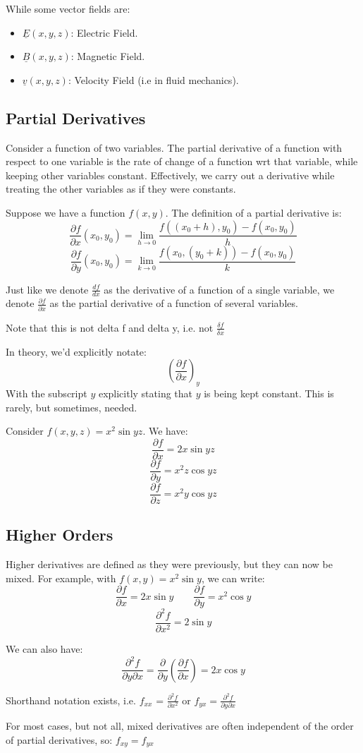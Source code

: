 While some vector fields are:
\begin{itemize}
    \item $\underline{E}(x, y, z)$: Electric Field.
    \item $\underline{B}(x, y, z)$: Magnetic Field.
    \item $\underline{v}(x, y, z)$: Velocity Field (i.e in fluid mechanics).
\end{itemize}

\subsection{Partial Derivatives}
Consider a function of two variables. The partial derivative of a function with respect to one variable is the rate of change of a function wrt that variable, while keeping other variables constant. Effectively, we carry out a derivative while treating the other variables as if they were constants.

Suppose we have a function $f(x, y)$. The definition of a partial derivative is:
\[
    \frac{\partial f}{\partial x}(x_0, y_0) = \lim_{h \to 0} \frac{f((x_0 + h), y_0) - f(x_0, y_0)}{h}
\]
\[
    \frac{\partial f}{\partial y}(x_0, y_0) = \lim_{k \to 0} \frac{f(x_0, (y_0 + k)) - f(x_0, y_0)}{k}
\]

Just like we denote $\frac{df}{dx}$ as the derivative of a function of a single variable, we denote $\frac{\partial f}{\partial x}$ as the partial derivative of a function of several variables.

Note that this is not delta f and delta y, i.e. not $\frac{\delta f}{\delta x}$

In theory, we'd explicitly notate:
\[
    \left(\frac{\partial f}{\partial x}\right)_y
\]
With the subscript $y$ explicitly stating that $y$ is being kept constant. This is rarely, but sometimes, needed.

Consider $f(x, y, z) = x^2 \sin yz$. We have:
\[
    \frac{\partial f}{\partial x} = 2x \sin yz
\]
\[
    \frac{\partial f}{\partial y} = x^2 z \cos yz
\]
\[
    \frac{\partial f}{\partial z} = x^2 y \cos yz
\]

\subsection{Higher Orders}
Higher derivatives are defined as they were previously, but they can now be mixed. For example, with $f(x, y) = x^2 \sin y$, we can write:
\[
    \frac{\partial f}{\partial x} = 2x \sin y \qquad \frac{\partial f}{\partial y} = x^2 \cos y
\]
\[
    \frac{\partial^2 f}{\partial x^2} = 2 \sin y
\]

We can also have:
\[
    \frac{\partial^2 f}{\partial y \partial x} = \frac{\partial}{\partial y} \left(\frac{\partial f}{\partial x}\right) = 2x \cos y
\]

Shorthand notation exists, i.e. $f_{xx}$ = $\frac{\partial^2 f}{\partial x^2}$ or $f_{yx} = \frac{\partial^2 f}{\partial y \partial x}$

For most cases, but not all, mixed derivatives are often independent of the order of partial derivatives, so: $f_{xy} = f_{yx}$